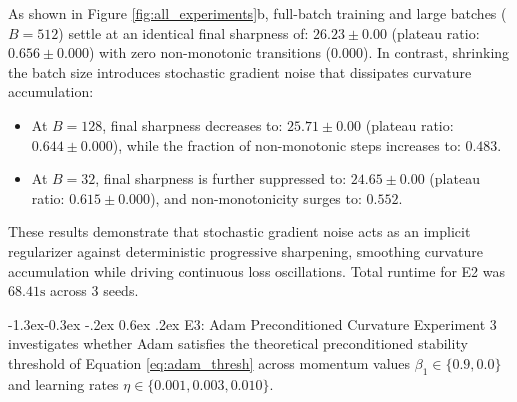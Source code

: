 \documentclass[10pt,twocolumn]{article}
\makeatletter
\renewcommand\subsection{\@startsection{subsection}{2}{\z@}%
                                     {-1.3ex\@plus -0.3ex \@minus -.2ex}%
                                     {0.6ex \@plus .2ex}%
                                     {\normalfont\normalsize\bfseries}}
\makeatother
\begin{document}
As shown in Figure \ref{fig:all_experiments}b, full-batch training and large batches ($B=512$) settle at an identical final sharpness of:
$26.23 \pm 0.00$
(plateau ratio:
$0.656 \pm 0.000$)
with zero non-monotonic transitions ($0.000$).
In contrast, shrinking the batch size introduces stochastic gradient noise that dissipates curvature accumulation:
\begin{itemize}
    \item At $B=128$, final sharpness decreases to:
    $25.71 \pm 0.00$
    (plateau ratio:
    $0.644 \pm 0.000$),
    while the fraction of non-monotonic steps increases to:
    $0.483$.
    \item At $B=32$, final sharpness is further suppressed to:
    $24.65 \pm 0.00$
    (plateau ratio:
    $0.615 \pm 0.000$),
    and non-monotonicity surges to:
    $0.552$.
\end{itemize}
These results demonstrate that stochastic gradient noise acts as an implicit regularizer against deterministic progressive sharpening, smoothing curvature accumulation while driving continuous loss oscillations. Total runtime for E2 was $68.41\text{s}$ %
across 3 seeds.

\subsection{E3: Adam Preconditioned Curvature}
Experiment 3 investigates whether Adam satisfies the theoretical preconditioned stability threshold of Equation \ref{eq:adam_thresh} across momentum values $\beta_1 \in \{0.9, 0.0\}$ and learning rates $\eta \in \{0.001, 0.003, 0.010\}$.
\end{document}
